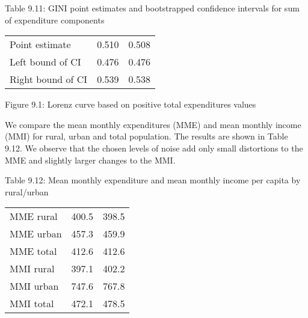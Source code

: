 \documentclass[letterpaper,10pt,english]{sphinxmanual}
\begin{document}
Table 9.11: GINI point estimates and bootstrapped confidence intervals
for sum of expenditure components


\begin{savenotes}\sphinxattablestart
\centering
\begin{tabulary}{\linewidth}[t]{|T|T|T|}
\hline
\sphinxstyletheadfamily &\sphinxstyletheadfamily 
{}
&\sphinxstyletheadfamily 
{}
\\
\hline
Point estimate
&
0.510
&
0.508
\\
\hline
Left bound of CI
&
0.476
&
0.476
\\
\hline
Right bound of CI
&
0.539
&
0.538
\\
\hline
\end{tabulary}
\par
\sphinxattableend\end{savenotes}

\noindent{}

Figure 9.1: Lorenz curve based on positive total expenditures values

We compare the mean monthly expenditures (MME) and mean monthly income
(MMI) for rural, urban and total population. The results are shown in
Table 9.12. We observe that the chosen levels of noise add only small
distortions to the MME and slightly larger changes to the MMI.

Table 9.12: Mean monthly expenditure and mean monthly income per capita
by rural/urban


\begin{savenotes}\sphinxattablestart
\centering
\begin{tabulary}{\linewidth}[t]{|T|T|T|}
\hline
\sphinxstyletheadfamily &\sphinxstyletheadfamily 
{}
&\sphinxstyletheadfamily 
{}
\\
\hline
MME rural
&
400.5
&
398.5
\\
\hline
MME urban
&
457.3
&
459.9
\\
\hline
MME total
&
412.6
&
412.6
\\
\hline
MMI rural
&
397.1
&
402.2
\\
\hline
MMI urban
&
747.6
&
767.8
\\
\hline
MMI total
&
472.1
&
478.5
\\
\hline
\end{tabulary}
\par
\sphinxattableend\end{savenotes}
\end{document}
